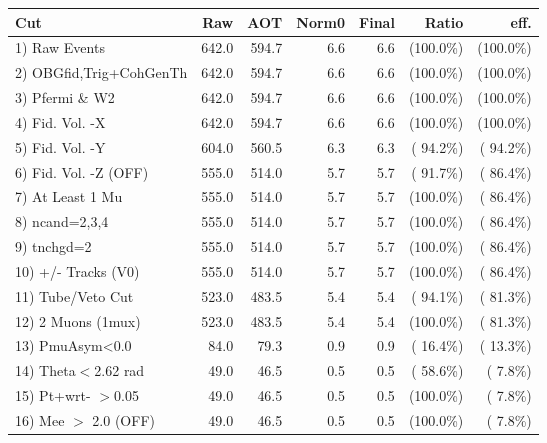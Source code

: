 \begin{table}[h!]\centering
 \begin{tabular}{||l||r|r|r|r|r|r||}
 \hline
 \hline
 Cut & Raw & AOT & Norm0 & Final & Ratio & eff.       \\
 \hline
  1) Raw Events           &        642.0 &        594.7 &          6.6 &          6.6 & (100.0\%) & (100.0\%) \\
  2) OBGfid,Trig+CohGenTh &        642.0 &        594.7 &          6.6 &          6.6 & (100.0\%) & (100.0\%) \\
  3) Pfermi \& W2         &        642.0 &        594.7 &          6.6 &          6.6 & (100.0\%) & (100.0\%) \\
  4) Fid. Vol. -X         &        642.0 &        594.7 &          6.6 &          6.6 & (100.0\%) & (100.0\%) \\
  5) Fid. Vol. -Y         &        604.0 &        560.5 &          6.3 &          6.3 & ( 94.2\%) & ( 94.2\%) \\
  6) Fid. Vol. -Z (OFF)   &        555.0 &        514.0 &          5.7 &          5.7 & ( 91.7\%) & ( 86.4\%) \\
  7) At Least 1 Mu        &        555.0 &        514.0 &          5.7 &          5.7 & (100.0\%) & ( 86.4\%) \\
  8) ncand=2,3,4          &        555.0 &        514.0 &          5.7 &          5.7 & (100.0\%) & ( 86.4\%) \\
  9) tnchgd=2             &        555.0 &        514.0 &          5.7 &          5.7 & (100.0\%) & ( 86.4\%) \\
 10) +/- Tracks (V0)      &        555.0 &        514.0 &          5.7 &          5.7 & (100.0\%) & ( 86.4\%) \\
 11) Tube/Veto Cut        &        523.0 &        483.5 &          5.4 &          5.4 & ( 94.1\%) & ( 81.3\%) \\
 12) 2 Muons (1mux)       &        523.0 &        483.5 &          5.4 &          5.4 & (100.0\%) & ( 81.3\%) \\
 13) PmuAsym<0.0          &         84.0 &         79.3 &          0.9 &          0.9 & ( 16.4\%) & ( 13.3\%) \\
 14) Theta$<$2.62 rad     &         49.0 &         46.5 &          0.5 &          0.5 & ( 58.6\%) & (  7.8\%) \\
 15) Pt+wrt- $>$0.05      &         49.0 &         46.5 &          0.5 &          0.5 & (100.0\%) & (  7.8\%) \\
 16) Mee $>$ 2.0  (OFF)   &         49.0 &         46.5 &          0.5 &          0.5 & (100.0\%) & (  7.8\%) \\

\end{tabular}
\end{table}
